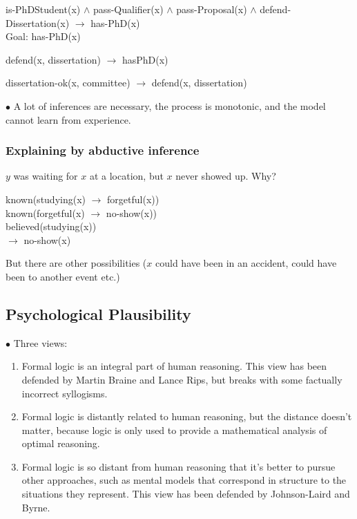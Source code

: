\documentclass[english,openany]{book}
\begin{document}
is-PhDStudent(x) $\wedge$ pass-Qualifier(x) $\wedge$ pass-Proposal(x) $\wedge$ defend-Dissertation(x) $\rightarrow$ has-PhD(x)\\

Goal: has-PhD(x)

defend(x, dissertation) $\rightarrow$ hasPhD(x)

dissertation-ok(x, committee) $\rightarrow$ defend(x, dissertation)

$\bullet$ A lot of inferences are necessary, the process is monotonic, and the model cannot learn from experience.

\subsubsection{Explaining by abductive inference}

$y$ was waiting for $x$ at a location, but $x$ never showed up. Why?

known(studying(x) $\rightarrow$ forgetful(x))\\
known(forgetful(x) $\rightarrow$ no-show(x))\\
believed(studying(x))\\
$\rightarrow$ no-show(x)

But there are other possibilities ($x$ could have been in an accident, could have been to another event etc.)


\subsection{Psychological Plausibility}

$\bullet$ Three views:

\begin{enumerate}[label=(\Alph*)]
    \item Formal logic is an integral part of human reasoning. This view has been defended by Martin Braine and Lance Rips, but breaks with some factually incorrect syllogisms.
    \item Formal logic is distantly related to human reasoning, but the distance doesn't matter, because logic is only used to provide a mathematical analysis of optimal reasoning.
    \item Formal logic is so distant from human reasoning that it's better to pursue other approaches, such as mental models that correspond in structure to the situations they represent. This view has been defended by Johnson-Laird and Byrne.
\end{enumerate}
\end{document}
